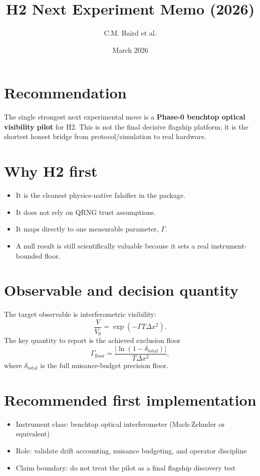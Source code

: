 \documentclass[11pt]{article}
\title{H2 Next Experiment Memo (2026)}
\author{C.M. Baird et al.}
\date{March 2026}
\begin{document}
\maketitle

\section*{Recommendation}
The single strongest next experimental move is a \textbf{Phase-0 benchtop optical visibility pilot} for H2. This is not the final decisive flagship platform; it is the shortest honest bridge from protocol/simulation to real hardware.

\section*{Why H2 first}
\begin{itemize}
    \item It is the cleanest physics-native falsifier in the package.
    \item It does not rely on QRNG trust assumptions.
    \item It maps directly to one measurable parameter, $\Gamma$.
    \item A null result is still scientifically valuable because it sets a real instrument-bounded floor.
\end{itemize}

\section*{Observable and decision quantity}
The target observable is interferometric visibility:
\[
\frac{V}{V_0} = \exp(-\Gamma T \Delta x^2).
\]
The key quantity to report is the achieved exclusion floor
\[
\Gamma_{\mathrm{floor}} = \frac{|\ln(1-\delta_{\mathrm{total}})|}{T\Delta x^2},
\]
where $\delta_{\mathrm{total}}$ is the full nuisance-budget precision floor.

\section*{Recommended first implementation}
\begin{itemize}
    \item Instrument class: benchtop optical interferometer (Mach-Zehnder or equivalent)
    \item Role: validate drift accounting, nuisance budgeting, and operator discipline
    \item Claim boundary: do not treat the pilot as a final flagship discovery test
\end{itemize}
\end{document}
